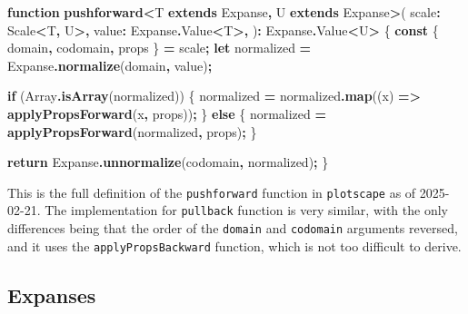 \documentclass[
]{book}
\newenvironment{Shaded}{\begin{snugshade}}{\end{snugshade}}
\newcommand{\AttributeTok}[1]{\textcolor[rgb]{0.13,0.29,0.53}{#1}}
\newcommand{\BuiltInTok}[1]{#1}
\newcommand{\ControlFlowTok}[1]{\textcolor[rgb]{0.13,0.29,0.53}{\textbf{#1}}}
\newcommand{\FunctionTok}[1]{\textcolor[rgb]{0.13,0.29,0.53}{\textbf{#1}}}
\newcommand{\KeywordTok}[1]{\textcolor[rgb]{0.13,0.29,0.53}{\textbf{#1}}}
\newcommand{\NormalTok}[1]{#1}
\newcommand{\OperatorTok}[1]{\textcolor[rgb]{0.81,0.36,0.00}{\textbf{#1}}}
\theoremstyle{definition}
\theoremstyle{definition}
\theoremstyle{definition}
\theoremstyle{definition}
\theoremstyle{remark}
\begin{document}
\begin{Shaded}
\begin{Highlighting}[]
\KeywordTok{function} \FunctionTok{pushforward}\OperatorTok{\textless{}}\NormalTok{T }\KeywordTok{extends}\NormalTok{ Expanse}\OperatorTok{,}\NormalTok{ U }\KeywordTok{extends}\NormalTok{ Expanse}\OperatorTok{\textgreater{}}\NormalTok{(}
\NormalTok{  scale}\OperatorTok{:}\NormalTok{ Scale}\OperatorTok{\textless{}}\NormalTok{T}\OperatorTok{,}\NormalTok{ U}\OperatorTok{\textgreater{},}
\NormalTok{  value}\OperatorTok{:}\NormalTok{ Expanse}\OperatorTok{.}\AttributeTok{Value}\OperatorTok{\textless{}}\NormalTok{T}\OperatorTok{\textgreater{},}
\NormalTok{)}\OperatorTok{:}\NormalTok{ Expanse}\OperatorTok{.}\AttributeTok{Value}\OperatorTok{\textless{}}\NormalTok{U}\OperatorTok{\textgreater{}}\NormalTok{ \{}
  \KeywordTok{const}\NormalTok{ \{ domain}\OperatorTok{,}\NormalTok{ codomain}\OperatorTok{,}\NormalTok{ props \} }\OperatorTok{=}\NormalTok{ scale}\OperatorTok{;}
  \KeywordTok{let}\NormalTok{ normalized }\OperatorTok{=}\NormalTok{ Expanse}\OperatorTok{.}\FunctionTok{normalize}\NormalTok{(domain}\OperatorTok{,}\NormalTok{ value)}\OperatorTok{;}

  \ControlFlowTok{if}\NormalTok{ (}\BuiltInTok{Array}\OperatorTok{.}\FunctionTok{isArray}\NormalTok{(normalized)) \{}
\NormalTok{    normalized }\OperatorTok{=}\NormalTok{ normalized}\OperatorTok{.}\FunctionTok{map}\NormalTok{((x) }\KeywordTok{=\textgreater{}} \FunctionTok{applyPropsForward}\NormalTok{(x}\OperatorTok{,}\NormalTok{ props))}\OperatorTok{;}
\NormalTok{  \} }\ControlFlowTok{else}\NormalTok{ \{}
\NormalTok{    normalized }\OperatorTok{=} \FunctionTok{applyPropsForward}\NormalTok{(normalized}\OperatorTok{,}\NormalTok{ props)}\OperatorTok{;}
\NormalTok{  \}}

  \ControlFlowTok{return}\NormalTok{ Expanse}\OperatorTok{.}\FunctionTok{unnormalize}\NormalTok{(codomain}\OperatorTok{,}\NormalTok{ normalized)}\OperatorTok{;}
\NormalTok{\}}
\end{Highlighting}
\end{Shaded}

This is the full definition of the \texttt{pushforward} function in \texttt{plotscape} as of 2025-02-21. The implementation for \texttt{pullback} function is very similar, with the only differences being that the order of the \texttt{domain} and \texttt{codomain} arguments reversed, and it uses the \texttt{applyPropsBackward} function, which is not too difficult to derive.

\subsection{Expanses}\label{expanses}
\end{document}
